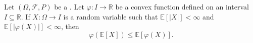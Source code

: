 \begin{proposition} \label{proposition:jensens_inequality_for_convex_functions_on_a_probability_space}
    Let $(\Omega, \mathcal{F}, P)$ be a . Let $\varphi : I \to \mathbb{R}$ be a convex function defined on an interval $I \subseteq \mathbb{R}$. If $X : \Omega \to I$ is a random variable such that $\mathbb{E}[|X|] < \infty$ and $\mathbb{E}[|\varphi(X)|] < \infty$, then
    $$\varphi(\mathbb{E}[X]) \leq \mathbb{E}[\varphi(X)].$$
\end{proposition}
